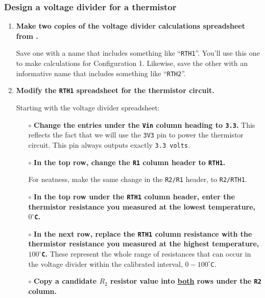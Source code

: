 \subsubsection{\howto Design a voltage divider for a thermistor}
\begin{enumerate}
	\item \textbf{Make two copies of the voltage divider calculations spreadsheet from .}

	Save one with a name that includes something like ``\texttt{RTH1}''. You'll use this one to make calculations for Configuration 1.
	Likewise, save the other with an informative name that includes something like ``\texttt{RTH2}''.

	\item \textbf{Modify the \texttt{RTH1} spreadsheet for the thermistor circuit.}

	Starting with the voltage divider spreadsheet:
	\begin{itemize}
		\item[$\circ$] \textbf{Change the entries under the \texttt{Vin} column heading to \texttt{3.3}.}
		This reflects the fact that we will use the \texttt{3V3} pin to power the thermistor circuit. This pin always outputs exactly \texttt{3.3 volts}.

%
		\item[$\circ$] \textbf{In the top row, change the \texttt{R1} column header to \texttt{RTH1}.}

		For neatness, make the same change in the \texttt{R2/R1} header, to \texttt{R2/RTH1}.
		\item[$\circ$] \textbf{In the top row under the \texttt{RTH1} column header, enter the thermistor resistance you measured at the lowest temperature, $0^\circ$\texttt{C}.}
		\item[$\circ$] \textbf{In the next row, replace the \texttt{RTH1} column resistance with the thermistor resistance you measured at the highest temperature, $100^\circ$\texttt{C}.}
		These represent the whole range of resistances that can occur in the voltage divider within the calibrated interval, $0-100^\circ$\texttt{C}.

		\item[$\circ$] \textbf{Copy a candidate $R_2$ resistor value into \underline{both} rows under the \texttt{R2} column.}


\end{itemize}
\end{enumerate}
